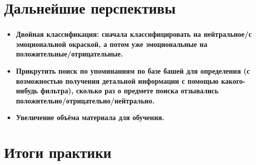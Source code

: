 \documentclass[t]{beamer}
\begin{document}
	\section{Дальнейшие перспективы}
	\begin{frame}
		\frametitle{\insertsection}
		\begin{itemize}
			\item
			\textbf{Двойная классификация: сначала классифицировать на нейтральное/с эмоциональной окраской, а потом уже эмоциональные на положительные/отрицательные. }
			\item
			\textbf{Прикрутить поиск по упоминаниям по базе башей для определения (с возможностью получения детальной информации с помощью какого-нибудь фильтра), сколько раз о предмете поиска отзывались положительно/отрицательно/нейтрально.}
			\item
			\textbf{Увеличение объёма материала для обучения.} 
			
		\end{itemize}
		
	\end{frame}
	
	
	\section{Итоги практики}
	
\end{document}
